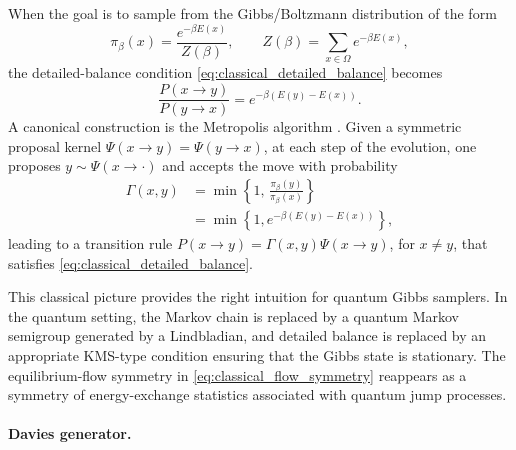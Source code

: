 \documentclass[showpacs,amsmath,amssymb,twocolumn,prx,superscriptaddress,10pt,aps,nofootinbib]{revtex4-2}
\begin{document}
When the goal is to sample from the Gibbs/Boltzmann distribution of the form
\begin{equation}
\label{eq:classical_gibbs_target}
    \pi_\beta(x)=\frac{e^{-\beta E(x)}}{Z(\beta)},
    \qquad
    Z(\beta)=\sum_{x\in\Omega} e^{-\beta E(x)},
\end{equation}
the detailed-balance condition \eqref{eq:classical_detailed_balance} becomes
\begin{equation}
\label{eq:Classical_KMS_condition}
    \frac{P(x\to y)}{P(y\to x)}=e^{-\beta(E(y)-E(x))}.
\end{equation}
A canonical construction is the Metropolis algorithm \cite{metropolis1953equation}. Given a symmetric proposal kernel $\Psi(x\to y)=\Psi(y\to x)$, at each step of the evolution, one proposes $y\sim\Psi(x\to\cdot)$ and accepts the move with probability
\begin{align}
\label{eq:metropolis_accept}
    \Gamma(x,y)
    &=
    \min\!\left\{
    1,\,
    \frac{\pi_\beta(y)}{\pi_\beta(x)}
    \right\} \nonumber \\
    &=
    \min\!\left\{1,e^{-\beta(E(y)-E(x))}\right\},
\end{align}
leading to a transition rule $P(x\to y)=\Gamma(x,y)\Psi(x\to y)$, for $x\neq y$, that satisfies \eqref{eq:classical_detailed_balance}.

This classical picture provides the right intuition for quantum Gibbs samplers. In the quantum setting, the Markov chain is replaced by a quantum Markov semigroup generated by a Lindbladian, and detailed balance is replaced by an appropriate KMS-type condition ensuring that the Gibbs state is stationary. The equilibrium-flow symmetry in \eqref{eq:classical_flow_symmetry} reappears as a symmetry of energy-exchange statistics associated with quantum jump processes.


\paragraph{Davies generator.}
\end{document}

